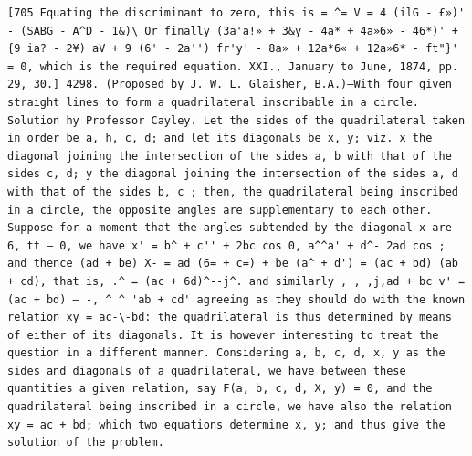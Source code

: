 \documentclass[11pt,a4paper]{book}
\begin{document}
\newpage
\setcounter{page}{578}
\begin{verbatim}
[705 Equating the discriminant to zero, this is = ^= V = 4 (ilG - £»)' - (SABG - A^D - 1&)\ Or finally (3a'a!» + 3&y - 4a* + 4a»6» - 46*)' + {9 ia? - 2¥) aV + 9 (6' - 2a'') fr'y' - 8a» + 12a*6« + 12a»6* - ft"}' = 0, which is the required equation. XXI., January to June, 1874, pp. 29, 30.] 4298. (Proposed by J. W. L. Glaisher, B.A.)—With four given straight lines to form a quadrilateral inscribable in a circle. Solution hy Professor Cayley. Let the sides of the quadrilateral taken in order be a, h, c, d; and let its diagonals be x, y; viz. x the diagonal joining the intersection of the sides a, b with that of the sides c, d; y the diagonal joining the intersection of the sides a, d with that of the sides b, c ; then, the quadrilateral being inscribed in a circle, the opposite angles are supplementary to each other. Suppose for a moment that the angles subtended by the diagonal x are 6, tt — 0, we have x' = b^ + c'' + 2bc cos 0, a^^a' + d^- 2ad cos ; and thence (ad + be) X- = ad (6= + c=) + be (a^ + d') = (ac + bd) (ab + cd), that is, .^ = (ac + 6d)^--j^. and similarly , , ,j,ad + bc v' = (ac + bd) — -, ^ ^ 'ab + cd' agreeing as they should do with the known relation xy = ac-\-bd: the quadrilateral is thus determined by means of either of its diagonals. It is however interesting to treat the question in a different manner. Considering a, b, c, d, x, y as the sides and diagonals of a quadrilateral, we have between these quantities a given relation, say F(a, b, c, d, X, y) = 0, and the quadrilateral being inscribed in a circle, we have also the relation xy = ac + bd; which two equations determine x, y; and thus give the solution of the problem. 
\end{verbatim}
\end{document}
